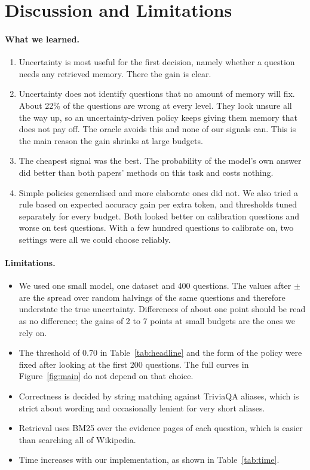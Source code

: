 \documentclass[11pt,a4paper]{article}
\begin{document}
\section{Discussion and Limitations}

\paragraph{What we learned.}
\begin{enumerate}
\item Uncertainty is most useful for the first decision, namely whether a
question needs any retrieved memory. There the gain is clear.
\item Uncertainty does not identify questions that no amount of memory will
fix. About 22\% of the questions are wrong at every level. They look unsure all
the way up, so an uncertainty-driven policy keeps giving them memory that does
not pay off. The oracle avoids this and none of our signals can. This is the
main reason the gain shrinks at large budgets.
\item The cheapest signal was the best. The probability of the model's own
answer did better than both papers' methods on this task and costs nothing.
\item Simple policies generalised and more elaborate ones did not. We also
tried a rule based on expected accuracy gain per extra token, and thresholds
tuned separately for every budget. Both looked better on calibration questions
and worse on test questions. With a few hundred questions to calibrate on, two
settings were all we could choose reliably.
\end{enumerate}

\paragraph{Limitations.}
\begin{itemize}
\item We used one small model, one dataset and 400 questions. The values after
$\pm$ are the spread over random halvings of the same questions and therefore
understate the true uncertainty. Differences of about one point should be read
as no difference; the gains of 2 to 7 points at small budgets are the ones we
rely on.
\item The threshold of 0.70 in Table~\ref{tab:headline} and the form of the
policy were fixed after looking at the first 200 questions. The full curves in
Figure~\ref{fig:main} do not depend on that choice.
\item Correctness is decided by string matching against TriviaQA aliases, which
is strict about wording and occasionally lenient for very short aliases.
\item Retrieval uses BM25 over the evidence pages of each question, which is
easier than searching all of Wikipedia.
\item Time increases with our implementation, as shown in Table~\ref{tab:time}.
\end{itemize}
\end{document}
